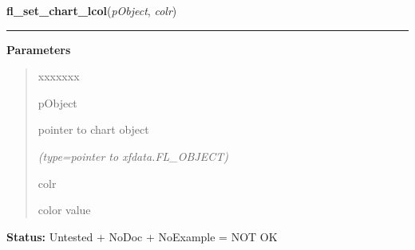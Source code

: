 \hspace{.8\funcindent}\begin{boxedminipage}{\funcwidth}

    \raggedright \textbf{fl\_set\_chart\_lcol}(\textit{pObject}, \textit{colr})

    \vspace{-1.5ex}

    \rule{\textwidth}{0.5\fboxrule}
\setlength{\parskip}{2ex}
\setlength{\parskip}{1ex}
      \textbf{Parameters}
      \vspace{-1ex}

      \begin{quote}
        \begin{Ventry}{xxxxxxx}

          \item[pObject]

          pointer to chart object

            {\it (type=pointer to xfdata.FL\_OBJECT)}

          \item[colr]

          color value

        \end{Ventry}

      \end{quote}

\textbf{Status:} Untested + NoDoc + NoExample = NOT OK



    \end{boxedminipage}

    \label{xformslib:library:fl_stuff_clipboard}

    \vspace{0.5ex}

